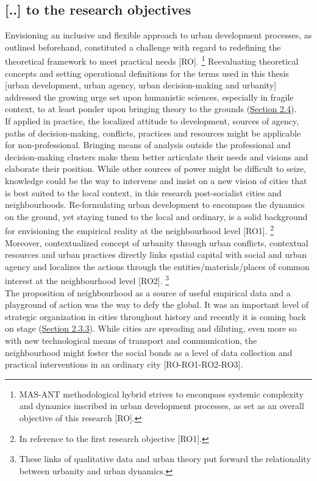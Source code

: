 \documentclass[11pt]{report}
\begin{document}
{\subsection{[..] to the research objectives}

Envisioning an inclusive and flexible approach to  urban development processes, as outlined beforehand, constituted a challenge with regard to redefining the theoretical framework to meet practical needs [RO].
\footnote{MAS-ANT methodological hybrid strives to encompass  systemic complexity and dynamics inscribed in urban development processes, as set as an overall objective of this research [RO].}
Reevaluating theoretical concepts and setting operational definitions for the terms used in this thesis [urban development, urban agency, urban decision-making and urbanity] addressed the growing urge set upon humanistic sciences, especially in fragile context, to at least ponder upon bringing theory to the grounds (\href{Section 2.4}{Section 2.4}).
\\

If applied in practice, the localized attitude to  development, sources of agency, paths of decision-making, conflicts, practices and resources might be applicable for non-professional. 
Bringing means of analysis outside the professional and decision-making clusters make them better articulate their needs and visions and elaborate their position.
While other sources of power might be difficult to seize, knowledge could be the way to intervene and insist on a new vision of cities that is best suited to the local context, in this research post-socialist cities and neighbourhoods.
Re-formulating urban development to encompass the dynamics on the ground, yet staying tuned to the local and ordinary, is a solid background for envisioning the empirical reality at the neighbourhood level [RO1].
\footnote{In reference to the first research objective [RO1].}
Moreover, contextualized concept of urbanity through urban conflicts, contextual resources and urban practices directly links spatial capital with social and urban agency and localizes the actions through the entities/materials/places of common interest at the neighbourhood level [RO2].
\footnote{These links of qualitative data and urban theory put forward the relationality between urbanity and urban dynamics.}
\\

The proposition of neighbourhood as a source of  useful empirical data and a playground of action was the way to defy the global. It was an important level of strategic organization in cities throughout history and recently it is coming back on stage (\href{Section 2.3.3}{Section 2.3.3}).
While cities are spreading and diluting, even more so with new technological means of transport and communication, the neighbourhood might foster the social bonds as a level of data collection and practical interventions in an ordinary city [RO-RO1-RO2-RO3].
\\

}
\end{document}
